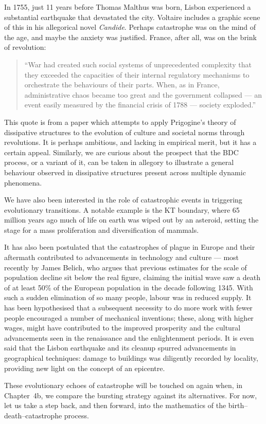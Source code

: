 In 1755, just 11 years before Thomas Malthus was born, Lisbon experienced a
substantial earthquake that devastated the city. Voltaire includes a graphic
scene of this in his allegorical novel \textit{Candide}. Perhaps catastrophe was
on the mind of the age, and maybe the anxiety was justified. France, after all,
was on the brink of revolution:

\begin{quotation}
``War had created such social systems of unprecedented complexity that they
exceeded the capacities of their internal regulatory mechanisms to orchestrate
the behaviours of their parts. When, as in France, administrative chaos became
too great and the government collapsed --- an event easily measured by the
financial crisis of 1788 --- society exploded.'' \cite{artigiani1987revolution}
\end{quotation}

This quote is from a paper which attempts to apply Prigogine's theory of
dissipative structures to the evolution of culture and societal norms through
revolutions. It is perhaps ambitious, and lacking in empirical merit, but it has
a certain appeal. Similarly, we are curious about the prospect that the BDC
process, or a variant of it, can be taken in allegory to illustrate a general
behaviour observed in dissipative structures present across multiple dynamic
phenomena.

We have also been interested in the role of catastrophic events in triggering
evolutionary transitions. A notable example is the KT boundary, where
65 million years ago much of life on earth was wiped out by an asteroid,
setting the stage for a mass proliferation and diversification of mammals.

It has also been postulated that the catastrophes of plague in Europe and their
aftermath contributed to advancements in technology and culture --- most recently
by James Belich, who argues that previous estimates for the scale of population
decline sit below the real figure, claiming the initial wave saw a death of at
least 50\% of the European population in the decade following 1345. With such a
sudden elimination of so many people, labour was in reduced supply. It has been
hypothesised that a subsequent necessity to do more work with fewer people
encouraged a number of mechanical inventions; these, along with higher wages,
might have contributed to the improved prosperity and the cultural advancements
seen in the renaissance and the enlightenment periods. It is even said that the
Lisbon earthquake and its cleanup spurred advancements in geographical
techniques: damage to buildings was diligently recorded by locality, providing
new light on the concept of an epicentre.

These evolutionary echoes of catastrophe will be touched on again when, in
Chapter~4b, we compare the bursting strategy against its alternatives. For now,
let us take a step back, and then forward, into the mathematics of the
birth--death--catastrophe process.
